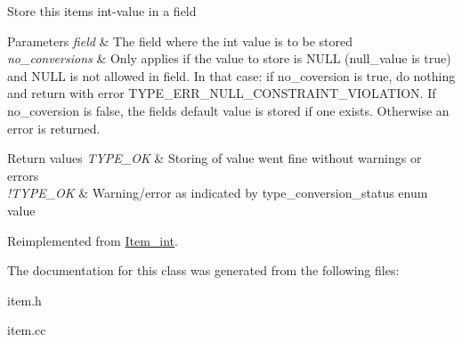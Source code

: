Store this item\textquotesingle{}s int-\/value in a field


\begin{DoxyParams}{Parameters}
{\em field} & The field where the int value is to be stored \\
\hline
{\em no\+\_\+conversions} & Only applies if the value to store is N\+U\+LL (null\+\_\+value is true) and N\+U\+LL is not allowed in field. In that case\+: if no\+\_\+coversion is true, do nothing and return with error T\+Y\+P\+E\+\_\+\+E\+R\+R\+\_\+\+N\+U\+L\+L\+\_\+\+C\+O\+N\+S\+T\+R\+A\+I\+N\+T\+\_\+\+V\+I\+O\+L\+A\+T\+I\+ON. If no\+\_\+coversion is false, the field\textquotesingle{}s default value is stored if one exists. Otherwise an error is returned.\\
\hline
\end{DoxyParams}

\begin{DoxyRetVals}{Return values}
{\em T\+Y\+P\+E\+\_\+\+OK} & Storing of value went fine without warnings or errors \\
\hline
{\em !\+T\+Y\+P\+E\+\_\+\+OK} & Warning/error as indicated by type\+\_\+conversion\+\_\+status enum value \\
\hline
\end{DoxyRetVals}


Reimplemented from \mbox{\hyperlink{classItem__int_a61fc7a6461f8d3f027fc91b5aeca8d1b}{Item\+\_\+int}}.



The documentation for this class was generated from the following files\+:\begin{DoxyCompactItemize}
\item 
item.\+h\item 
item.\+cc\end{DoxyCompactItemize}
